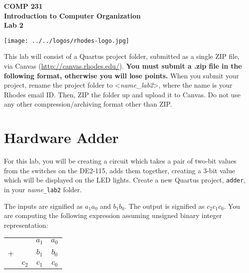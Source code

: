 \documentclass[10pt]{article}
\begin{document}

\hspace{-5mm}
\begin{minipage}{0.65\linewidth}
  \textbf{{\Large COMP 231\\
      Introduction to Computer Organization\\Lab 2}}
\end{minipage}
\begin{minipage}{0.35\linewidth}
  \texttt{[image: ../../logos/rhodes-logo.jpg]}
\end{minipage}

\vspace{.25in}

This lab will consist of a Quartus project folder, submitted as a
single ZIP file, via Canvas (\url{http://canvas.rhodes.edu/}).
{\bf You must submit a .zip file in the following format, otherwise
  you will lose points.} When you submit your project, rename the
project folder to <{\em name\_lab2}>, where the name is your Rhodes
email ID. Then, ZIP the folder up and upload it to Canvas. Do not
use any other compression/archiving format other than ZIP.

\section*{Hardware Adder}

For this lab, you will be creating a circuit which takes a pair of two-bit
values from the switches on the DE2-115, adds them together, creating a 3-bit
value which will be displayed on the LED lights. Create a new Quartus project,
{\tt adder}, in your {\em name}{\tt\_lab2} folder.

The inputs are signified as $a_1 a_0$ and $b_1 b_0$. The output is
signified as $c_2 c_1 c_0$. You are computing the following expression
assuming unsigned binary integer representation:

\begin{center}
\begin{tabular}[h]{cccc}
    &       & $a_1$ & $a_0$ \\
  + &       & $b_1$ & $b_0$ \\\hline
    & $c_2$ & $c_1$ & $c_0$ \\
\end{tabular}
\end{center}
\end{document}
